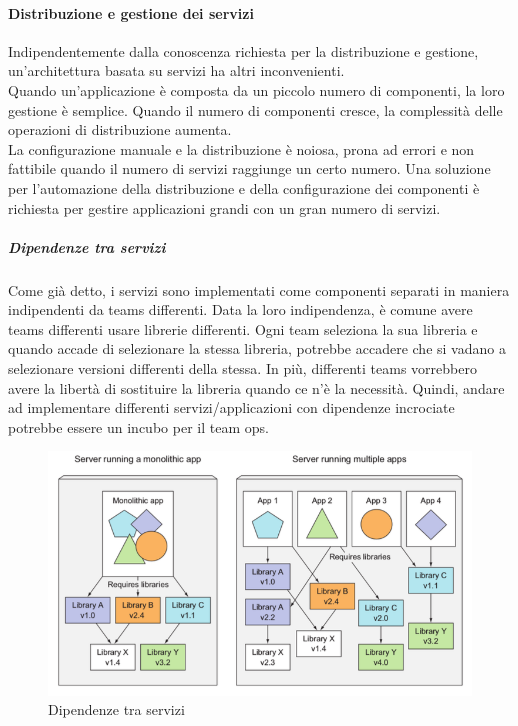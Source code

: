 \documentclass{article}
\begin{document}
\paragraph{Distribuzione e gestione dei servizi}
Indipendentemente dalla conoscenza richiesta per la distribuzione e gestione, un'architettura basata su servizi ha altri inconvenienti. \\
Quando un'applicazione è composta da un piccolo numero di componenti, la loro gestione è semplice. Quando il numero di componenti cresce, la complessità delle operazioni di distribuzione aumenta. \\  
La configurazione manuale e la distribuzione è noiosa, prona ad errori e non fattibile quando il numero di servizi raggiunge un certo numero. Una soluzione per l'automazione della distribuzione e della configurazione dei componenti è richiesta per gestire applicazioni grandi con un gran numero di servizi. 
\subparagraph{Dipendenze tra servizi}
Come già detto, i servizi sono implementati come componenti separati in maniera indipendenti da teams differenti. Data la loro indipendenza, è comune avere teams differenti usare librerie differenti. Ogni team seleziona la sua libreria e quando accade di selezionare la stessa libreria, potrebbe accadere che si vadano a selezionare versioni differenti della stessa. In più, differenti teams vorrebbero avere la libertà di sostituire la libreria quando ce n'è la necessità. Quindi, andare ad implementare differenti servizi/applicazioni con dipendenze incrociate potrebbe essere un incubo per il team ops.
\begin{figure}[H]
    \centering
    \includegraphics[scale=0.4]{img/dipendenze tra servizi.png}
    \caption{Dipendenze tra servizi}
\end{figure}\noindent
\end{document}
